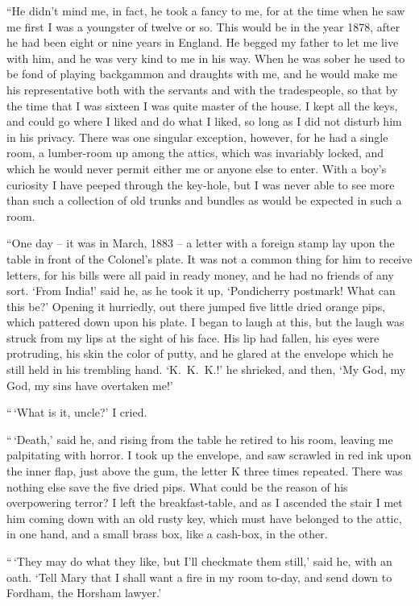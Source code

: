 “He didn’t mind me, in fact, he took a fancy to me, for at
the time when he saw me first I was a youngster of twelve or
so. This would be in the year 1878, after he had been eight
or nine years in England. He begged my father to let me
live with him, and he was very kind to me in his way. When
he was sober he used to be fond of playing backgammon and
draughts with me, and he would make me his representative
both with the servants and with the tradespeople, so that by
the time that I was sixteen I was quite master of the house.
I kept all the keys, and could go where I liked and do what I
liked, so long as I did not disturb him in his privacy. There
was one singular exception, however, for he had a single room,
a lumber-room up among the attics, which was invariably
locked, and which he would never permit either me or anyone
else to enter. With a boy’s curiosity I have peeped through
the key-hole, but I was never able to see more than such a
collection of old trunks and bundles as would be expected in
such a room.

“One day -- it was in March, 1883 -- a letter with a foreign
stamp lay upon the table in front of the Colonel’s plate. It
was not a common thing for him to receive letters, for his bills
were all paid in ready money, and he had no friends of any
sort. ‘From India!’ said he, as he took it up, ‘Pondicherry
postmark! What can this be?’ Opening it hurriedly, out
there jumped five little dried orange pips, which pattered
down upon his plate. I began to laugh at this, but the laugh
was struck from my lips at the sight of his face. His lip had
fallen, his eyes were protruding, his skin the color of putty,
and he glared at the envelope which he still held in his trembling
hand. ‘K.\ K.\ K.!’ he shrieked, and then, ‘My God, my
God, my sins have overtaken me!’

“\,‘What is it, uncle?’ I cried.

“\,‘Death,’ said he, and rising from the table he retired to
his room, leaving me palpitating with horror. I took up the
envelope, and saw scrawled in red ink upon the inner flap,
just above the gum, the letter K three times repeated. There
was nothing else save the five dried pips. What could be the
reason of his overpowering terror? I left the breakfast-table,
and as I ascended the stair I met him coming down with an
old rusty key, which must have belonged to the attic, in one
hand, and a small brass box, like a cash-box, in the other.

“\,‘They may do what they like, but I’ll checkmate them
still,’ said he, with an oath. ‘Tell Mary that I shall want a
fire in my room to-day, and send down to Fordham, the Horsham
lawyer.’

